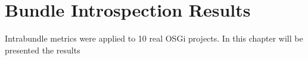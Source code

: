 \chapter{Bundle Introspection Results}

Intrabundle metrics were applied to 10 real OSGi projects. In this chapter will be presented the results 

